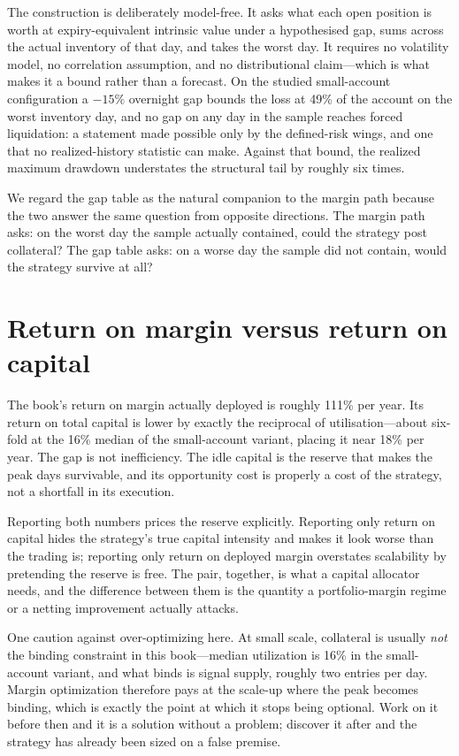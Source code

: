 \documentclass[11pt]{article}
\begin{document}
The construction is deliberately model-free. It asks what each open position is worth at
expiry-equivalent intrinsic value under a hypothesised gap, sums across the actual inventory of
that day, and takes the worst day. It requires no volatility model, no correlation assumption,
and no distributional claim---which is what makes it a bound rather than a forecast. On the
studied small-account configuration a $-15\%$ overnight gap bounds the loss at 49\% of the
account on the worst inventory day, and no gap on any day in the sample reaches forced
liquidation: a statement made possible only by the defined-risk wings, and one that no
realized-history statistic can make. Against that bound, the realized maximum drawdown
understates the structural tail by roughly six times.

We regard the gap table as the natural companion to the margin path because the two answer the
same question from opposite directions. The margin path asks: on the worst day the sample
actually contained, could the strategy post collateral? The gap table asks: on a worse day the
sample did not contain, would the strategy survive at all?

\section{Return on margin versus return on capital}\label{sec:ronm}
The book's return on margin actually deployed is roughly 111\% per year. Its return on total
capital is lower by exactly the reciprocal of utilisation---about six-fold at the 16\% median of
the small-account variant, placing it near 18\% per year. The gap is not inefficiency. The idle capital is the
reserve that makes the peak days survivable, and its opportunity cost is properly a cost of the
strategy, not a shortfall in its execution.

Reporting both numbers prices the reserve explicitly. Reporting only return on capital hides
the strategy's true capital intensity and makes it look worse than the trading is; reporting
only return on deployed margin overstates scalability by pretending the reserve is free. The
pair, together, is what a capital allocator needs, and the difference between them is the
quantity a portfolio-margin regime or a netting improvement actually attacks.

One caution against over-optimizing here. At small scale, collateral is usually \emph{not} the
binding constraint in this book---median utilization is 16\% in the small-account variant, and
what binds is signal supply,
roughly two entries per day. Margin optimization therefore pays at the scale-up where the peak
becomes binding, which is exactly the point at which it stops being optional. Work on it before
then and it is a solution without a problem; discover it after and the strategy has already
been sized on a false premise.
\end{document}
